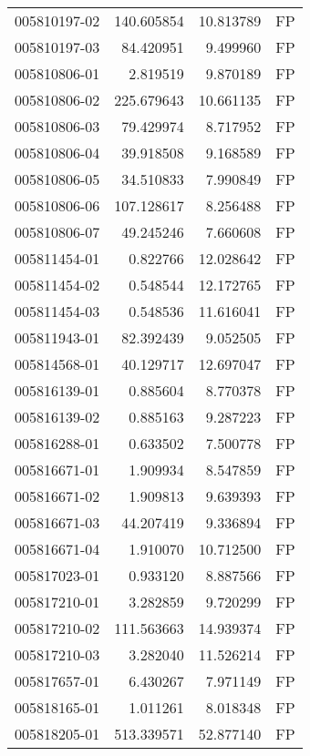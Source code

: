 \begin{tabular}{lrrl}
005810197-02 &  140.605854 &      10.813789 &   FP \\
005810197-03 &   84.420951 &       9.499960 &   FP \\
005810806-01 &    2.819519 &       9.870189 &   FP \\
005810806-02 &  225.679643 &      10.661135 &   FP \\
005810806-03 &   79.429974 &       8.717952 &   FP \\
005810806-04 &   39.918508 &       9.168589 &   FP \\
005810806-05 &   34.510833 &       7.990849 &   FP \\
005810806-06 &  107.128617 &       8.256488 &   FP \\
005810806-07 &   49.245246 &       7.660608 &   FP \\
005811454-01 &    0.822766 &      12.028642 &   FP \\
005811454-02 &    0.548544 &      12.172765 &   FP \\
005811454-03 &    0.548536 &      11.616041 &   FP \\
005811943-01 &   82.392439 &       9.052505 &   FP \\
005814568-01 &   40.129717 &      12.697047 &   FP \\
005816139-01 &    0.885604 &       8.770378 &   FP \\
005816139-02 &    0.885163 &       9.287223 &   FP \\
005816288-01 &    0.633502 &       7.500778 &   FP \\
005816671-01 &    1.909934 &       8.547859 &   FP \\
005816671-02 &    1.909813 &       9.639393 &   FP \\
005816671-03 &   44.207419 &       9.336894 &   FP \\
005816671-04 &    1.910070 &      10.712500 &   FP \\
005817023-01 &    0.933120 &       8.887566 &   FP \\
005817210-01 &    3.282859 &       9.720299 &   FP \\
005817210-02 &  111.563663 &      14.939374 &   FP \\
005817210-03 &    3.282040 &      11.526214 &   FP \\
005817657-01 &    6.430267 &       7.971149 &   FP \\
005818165-01 &    1.011261 &       8.018348 &   FP \\
005818205-01 &  513.339571 &      52.877140 &   FP \\

\end{tabular}
